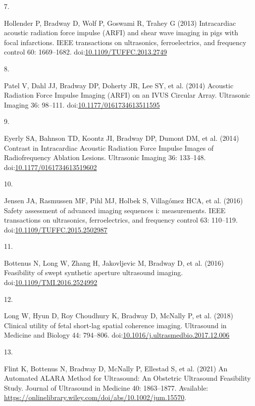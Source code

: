 \documentclass[
]{article}
\newlength{\cslhangindent}
\newlength{\csllabelwidth}
\newenvironment{CSLReferences}[2] %
 {\begin{list}{}{%
  \setlength{\itemindent}{0pt}
  \setlength{\leftmargin}{0pt}
  \setlength{\parsep}{0pt}
  \ifodd #1
   \setlength{\leftmargin}{\cslhangindent}
   \setlength{\itemindent}{-1\cslhangindent}
  \fi
  \setlength{\itemsep}{#2\baselineskip}}}
 {\end{list}}
\newcommand{\CSLLeftMargin}[1]{\parbox[t]{\csllabelwidth}{\strut#1\strut}}
\newcommand{\CSLRightInline}[1]{\parbox[t]{\linewidth - \csllabelwidth}{\strut#1\strut}}
\begin{document}
\begin{CSLReferences}{0}{1}
\CSLLeftMargin{7. }%
\CSLRightInline{Hollender P, Bradway D, Wolf P, Goswami R, Trahey G
(2013) Intracardiac acoustic radiation force impulse (ARFI) and shear
wave imaging in pigs with focal infarctions. IEEE transactions on
ultrasonics, ferroelectrics, and frequency control 60: 1669--1682.
doi:\href{https://doi.org/10.1109/TUFFC.2013.2749}{10.1109/TUFFC.2013.2749}}

\CSLLeftMargin{8. }%
\CSLRightInline{Patel V, Dahl JJ, Bradway DP, Doherty JR, Lee SY, et al.
(2014) {Acoustic Radiation Force Impulse Imaging (ARFI) on an IVUS
Circular Array}. Ultrasonic Imaging 36: 98--111.
doi:\href{https://doi.org/10.1177/0161734613511595}{10.1177/0161734613511595}}

\CSLLeftMargin{9. }%
\CSLRightInline{Eyerly SA, Bahnson TD, Koontz JI, Bradway DP, Dumont DM,
et al. (2014) {Contrast in Intracardiac Acoustic Radiation Force Impulse
Images of Radiofrequency Ablation Lesions}. Ultrasonic Imaging 36:
133--148.
doi:\href{https://doi.org/10.1177/0161734613519602}{10.1177/0161734613519602}}

\CSLLeftMargin{10. }%
\CSLRightInline{Jensen JA, Rasmussen MF, Pihl MJ, Holbek S, Villagómez
HCA, et al. (2016) Safety assessment of advanced imaging sequences i:
measurements. IEEE transactions on ultrasonics, ferroelectrics, and
frequency control 63: 110--119.
doi:\href{https://doi.org/10.1109/TUFFC.2015.2502987}{10.1109/TUFFC.2015.2502987}}

\CSLLeftMargin{11. }%
\CSLRightInline{Bottenus N, Long W, Zhang H, Jakovljevic M, Bradway D,
et al. (2016) Feasibility of swept synthetic aperture ultrasound
imaging.
doi:\href{https://doi.org/10.1109/TMI.2016.2524992}{10.1109/TMI.2016.2524992}}

\CSLLeftMargin{12. }%
\CSLRightInline{Long W, Hyun D, Roy Choudhury K, Bradway D, McNally P,
et al. (2018) {Clinical utility of fetal short-lag spatial coherence
imaging}. Ultrasound in Medicine and Biology 44: 794--806.
doi:\href{https://doi.org/10.1016/j.ultrasmedbio.2017.12.006}{10.1016/j.ultrasmedbio.2017.12.006}}

\CSLLeftMargin{13. }%
\CSLRightInline{Flint K, Bottenus N, Bradway D, McNally P, Ellestad S,
et al. (2021) {An Automated ALARA Method for Ultrasound: An Obstetric
Ultrasound Feasibility Study}. Journal of Ultrasound in Medicine 40:
1863--1877. Available:
\url{https://onlinelibrary.wiley.com/doi/abs/10.1002/jum.15570}.}


\end{CSLReferences}
\end{document}
